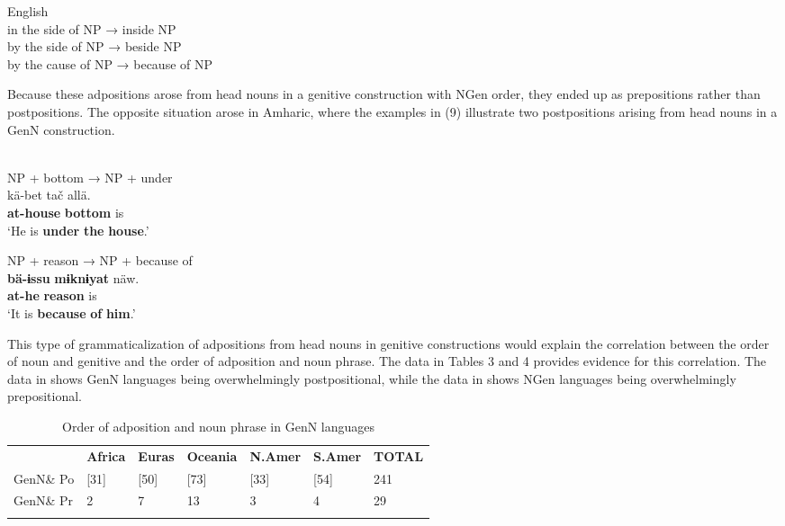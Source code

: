 \documentclass[output=paper]{langsci/langscibook}
\begin{document}
\ea
{English}\\
\ea in the side of NP → inside NP\\
\ex by the side of NP → beside NP\\
\ex by the cause of NP → because of NP\\
\z
\z

Because these adpositions arose from head nouns in a genitive construction with NGen order, they ended up as prepositions rather than postpositions. The opposite situation arose in Amharic, where the examples in (9) illustrate two postpositions arising from head nouns in a GenN construction.

\ea\label{ex:dryer:}
 \\
\ea
NP + bottom → NP + under\\

\gll   kä-bet    tač    allä.\\
       \textbf{at-house}  \textbf{bottom}  is\\
\glt   ‘He is \textbf{under} \textbf{the} \textbf{house}.’

\ex  NP + reason → NP + because of\\

\gll   \textbf{bä-ɨssu}  \textbf{mɨknɨyat}  näw.\\
       \textbf{at-he}    \textbf{reason}  is\\
\glt   ‘It is \textbf{because} \textbf{of} \textbf{him}.’
\z
\z

This type of grammaticalization of adpositions from head nouns in genitive constructions would explain the correlation between the order of noun and genitive and the order of adposition and noun phrase. The data in Tables 3 and 4 provides evidence for this correlation. The data in  shows GenN languages being overwhelmingly postpositional, while the data in  shows NGen languages being overwhelmingly prepositional.

\begin{table}
\begin{tabularx}{\textwidth}{XXXXXXX} & \bfseries Africa & \bfseries Euras & \bfseries Oceania & \bfseries N.Amer & \bfseries S.Amer & \bfseries TOTAL\\
\lsptoprule
GenN\& Po & [31] & [50] & [73] & [33] & [54] & 241\\
GenN\& Pr & 2 & 7 & 13 & 3 & 4 & 29\\
\lspbottomrule
\end{tabularx}
\caption{\label{tab:dryer:3}Order of adposition and noun phrase in GenN languages}
\end{table}
\end{document}
